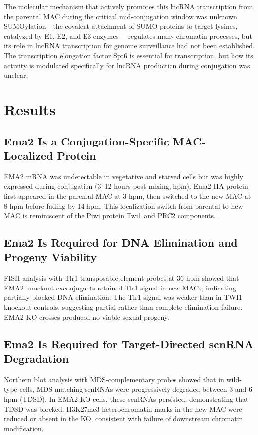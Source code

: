 \documentclass[11pt]{article}
\begin{document}
The molecular mechanism that actively promotes this lncRNA transcription from the parental MAC during the critical mid-conjugation window was unknown. SUMOylation---the covalent attachment of SUMO proteins to target lysines, catalyzed by E1, E2, and E3 enzymes \citep{johnson2004sumo}---regulates many chromatin processes, but its role in lncRNA transcription for genome surveillance had not been established. The transcription elongation factor Spt6 \citep{endoh2009spt6} is essential for transcription, but how its activity is modulated specifically for lncRNA production during conjugation was unclear.

\section{Results}

\subsection{Ema2 Is a Conjugation-Specific MAC-Localized Protein}

EMA2 mRNA was undetectable in vegetative and starved cells but was highly expressed during conjugation (3--12 hours post-mixing, hpm). Ema2-HA protein first appeared in the parental MAC at 3 hpm, then switched to the new MAC at 8 hpm before fading by 14 hpm. This localization switch from parental to new MAC is reminiscent of the Piwi protein Twi1 and PRC2 components.

\subsection{Ema2 Is Required for DNA Elimination and Progeny Viability}

FISH analysis with Tlr1 transposable element probes at 36 hpm showed that EMA2 knockout exconjugants retained Tlr1 signal in new MACs, indicating partially blocked DNA elimination. The Tlr1 signal was weaker than in TWI1 knockout controls, suggesting partial rather than complete elimination failure. EMA2 KO crosses produced no viable sexual progeny.

\subsection{Ema2 Is Required for Target-Directed scnRNA Degradation}

Northern blot analysis with MDS-complementary probes showed that in wild-type cells, MDS-matching scnRNAs were progressively degraded between 3 and 6 hpm (TDSD). In EMA2 KO cells, these scnRNAs persisted, demonstrating that TDSD was blocked. H3K27me3 heterochromatin marks in the new MAC were reduced or absent in the KO, consistent with failure of downstream chromatin modification.
\end{document}
